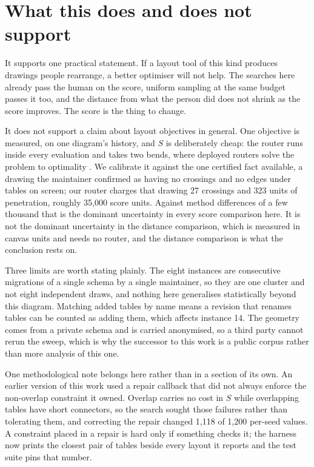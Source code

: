\documentclass[11pt]{article}
\begin{document}
\section{What this does and does not support}

It supports one practical statement. If a layout tool of this kind produces drawings people
rearrange, a better optimiser will not help. The searches here already pass the human on the
score, uniform sampling at the same budget passes it too, and the distance from what the person
did does not shrink as the score improves. The score is the thing to change.

It does not support a claim about layout objectives in general. One objective is measured, on
one diagram's history, and $S$ is deliberately cheap: the router runs inside every evaluation and
takes two bends, where deployed routers solve the problem to optimality \cite{wms09}. We
calibrate it against the one certified fact available, a drawing the maintainer confirmed as
having no crossings and no edges under tables on screen; our router charges that drawing 27
crossings and 323 units of penetration, roughly 35{,}000 score units. Against method differences
of a few thousand that is the dominant uncertainty in every score comparison here. It is not the
dominant uncertainty in the distance comparison, which is measured in canvas units and needs no
router, and the distance comparison is what the conclusion rests on.

Three limits are worth stating plainly. The eight instances are consecutive migrations of a
single schema by a single maintainer, so they are one cluster and not eight independent draws,
and nothing here generalises statistically beyond this diagram. Matching added tables by name
means a revision that renames tables can be counted as adding them, which affects instance 14.
The geometry comes from a private schema and is carried anonymised, so a third party cannot
rerun the sweep, which is why the successor to this work is a public corpus rather than more
analysis of this one.

One methodological note belongs here rather than in a section of its own. An earlier version of
this work used a repair callback that did not always enforce the non-overlap constraint it
owned. Overlap carries no cost in $S$ while overlapping tables have short connectors, so the
search sought those failures rather than tolerating them, and correcting the repair changed
1{,}118 of 1{,}200 per-seed values. A constraint placed in a repair is hard only if something
checks it; the harness now prints the closest pair of tables beside every layout it reports and
the test suite pins that number.
\end{document}
